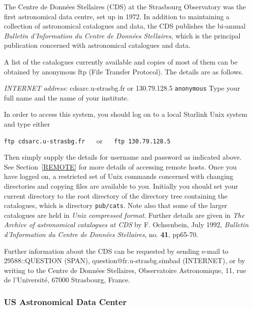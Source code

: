\documentclass[twoside,11pt]{article}
\newcommand{\xlabel}[1]{}
\begin{document}
The Centre de Donn\'{e}es Stellaires (CDS) at the Strasbourg Observatory
was the first astronomical data centre, set up in 1972. In addition to 
maintaining a collection of astronomical catalogues and data, the CDS
publishes the bi-annual {\it Bulletin d'Information du Centre de 
Donn\'{e}es Stellaires}, which is the principal publication concerned
with astronomical catalogues and data.

A list of the catalogues currently available and copies of most of them
can be obtained by anonymous ftp (File Transfer Protocol). The details 
are as follows.

{\it INTERNET address: } cdsarc.u-strasbg.fr or 130.79.128.5
 \verb-anonymous-
 Type your full name and the name of your 
institute.

In order to access this system, you should log on to a local Starlink
Unix system and type either

\vspace{2.0 mm}
\verb:ftp cdsarc.u-strasbg.fr: ~~ or ~~ \verb:ftp 130.79.128.5:
\vspace{2.0 mm}

Then simply supply the details for username and password as indicated
above.  See Section~\ref{REMOTE} for more details of accessing remote 
hosts. Once you have logged on, a restricted set of Unix commands 
concerned with changing directories and copying files are available to 
you. Initially you should set your current directory to the root 
directory of the directory tree containing the catalogues, which is 
directory \verb-pub/cats-. Note also that some of the larger catalogues 
are held in {\it Unix compressed format}. Further details are given in 
{\it The Archive of astronomical catalogues at CDS} by F. Ochsenbein, 
July 1992, {\it Bulletin d'Information du Centre de Donn\'{e}es 
Stellaires}, no. {\bf 41}, pp65-70.

Further information about the CDS can be requested by sending e-mail
to 29588::QUESTION (SPAN), question@fr.u-strasbg.simbad (INTERNET), or 
by writing to the Centre de Donn\'{e}es Stellaires, Observatoire 
Astronomique, 11, rue de l'Universit\'{e}, 67000 Strasbourg, France.

\subsubsection{US Astronomical Data Center
\xlabel{us_astronomical_data_center}\label{ADC}}
\end{document}
